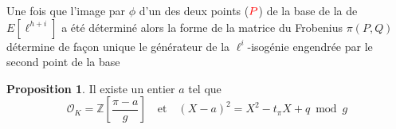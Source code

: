 \documentclass[10pt,a4paper]{beamer}
\theoremstyle{plain}
\theoremstyle{definition}
\theoremstyle{definition}
\theoremstyle{definition}
\newtheorem{prop}[thm]{Proposition}
\theoremstyle{definition}
\theoremstyle{remark}
\theoremstyle{remark}
\begin{document}
\begin{frame}
\begin{center}
\end{center}
Une fois que l'image par $\phi$ d'un des deux points ($\color{red} P$) de la base de la de $E[\ell^{h+i}]$ a été déterminé alors la forme de la matrice du Frobenius $\pi(P,Q)$ détermine de façon unique le générateur de la $\ell^i$-isogénie engendrée par le second point de la base
\end{frame}




\begin{frame}
\begin{prop}
Il existe un entier $a$ tel que \[\mathcal{O}_K=\mathbb{Z} \left[ \frac{\pi-a}{g} \right] \quad \text{et} \quad (X-a)^2=X^2-t_{\pi}X+q \bmod g \]
\end{prop}

\end{frame}
\end{document}
